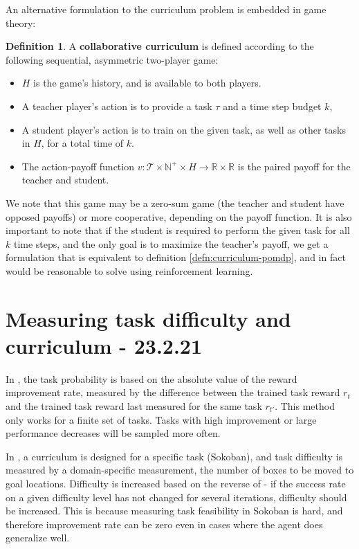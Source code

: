 \documentclass[letterpaper]{article}
\theoremstyle{definition}
\newtheorem{defn}{Definition}[section]
\begin{document}
An alternative formulation to the curriculum problem is embedded in game theory:
\begin{defn} \label{defn:curriculum-game-theory}
	A \textbf{collaborative curriculum} is defined according to the following sequential, asymmetric two-player game:
	\begin{itemize}
	\item $H$ is the game's history, and is available to both players.
	\item A teacher player's action is to provide a task $\tau$ and a time step budget $k$,
	\item A student player's action is to train on the given task, as well as other tasks in $H$, for a total time of $k$.
	\item The action-payoff function $v:\mathcal{T}\times \mathbb{N^+} \times H \rightarrow \mathbb{R}\times \mathbb{R}$ is the paired payoff for the teacher and student. 
	\end{itemize}
\end{defn}

We note that this game may be a zero-sum game (the teacher and student have opposed payoffs) or more cooperative, depending on the payoff function.
It is also important to note that if the student is required to perform the given task for all $k$ time steps, and the only goal is to maximize the teacher's payoff, we get a formulation that is equivalent to definition \ref{defn:curriculum-pomdp}, and in fact would be reasonable to solve using reinforcement learning.


\section{Measuring task difficulty and curriculum - 23.2.21} \label{sec:difficulty}

In \cite{Matiisen2020}, the task probability is based on the absolute value of the reward improvement rate, measured by the difference between the trained task reward $r_t$ and the trained task reward last measured for the same task $r_{t'}$.
This method only works for a finite set of tasks. Tasks with high improvement or large performance decreases will be sampled more often.

In \cite{Feng2020}, a curriculum is designed for a specific task (Sokoban), and task difficulty is measured by a domain-specific measurement, the number of boxes to be moved to goal locations. Difficulty is increased based on the reverse of \cite{Matiisen2020} - if the success rate on a given difficulty level has not changed for several iterations, difficulty should be increased. This is because measuring task feasibility in Sokoban is hard, and therefore improvement rate can be zero even in cases where the agent does generalize well.
\end{document}
